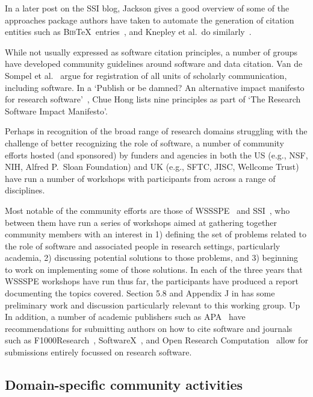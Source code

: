\documentclass[11pt, oneside]{amsart}
\newcommand{\katznote}[1]{ {\textcolor{blue} { ***DSK: #1 }}} %
\newcommand{\asnote}[1]{ {\textcolor{red} { ***AMS: #1 }}} %
\begin{document}
In a later post on the SSI blog, Jackson gives a good overview of some of the approaches
package authors have taken to automate the generation of citation entities such as \textsc{Bib}\TeX\ entries~\cite{ssi-how-shalt-i-cite-thee},
and Knepley et al.\ do similarly~\cite{knepley2013accurately}.

While not usually expressed as software citation principles, a number of groups have developed community guidelines around software and data citation. Van de Sompel et al.~\cite{VandeSompel2004} argue for registration of all units of scholarly communication, including software. In a `Publish or be damned? An alternative impact manifesto for research software'~\cite{ssi-publish-or-be-damned}, Chue Hong lists nine principles as part of `The Research Software Impact Manifesto'.

Perhaps in recognition of the broad range of research domains struggling with
the challenge of better recognizing the role of software, a number of community
efforts hosted (and sponsored) by funders and agencies in both the US (e.g., NSF,
NIH, Alfred P.\ Sloan Foundation) and UK (e.g., SFTC, JISC, Wellcome Trust) have run a number of
workshops with participants from across a range of disciplines.

Most notable of the community efforts are those of WSSSPE~\cite{wssspe} and
SSI~\cite{ssi-workshops}, who between them have run a series of workshops aimed
at gathering together community members with an interest in 1) defining the set of problems
related to the role of software and associated people in research settings, particularly academia,
2) discussing potential solutions to those problems, and 3) beginning to work on implementing
some of those solutions.
In each of the three years that
WSSSPE workshops have run thus far, the participants have produced a report
documenting the topics covered. Section 5.8 and Appendix J in \cite{WSSSPE3}
has some preliminary work and discussion particularly relevant to this working
group.
Up
In addition, a number of academic publishers such as APA~\cite{APA-guidelines} have recommendations for submitting authors on how to cite software and journals such as F1000Research~\cite{F1000}, SoftwareX~\cite{softwareX}, and Open Research Computation~\cite{softwareX} allow for submissions entirely focussed on research software.

\subsection{Domain-specific community activities}
\end{document}
